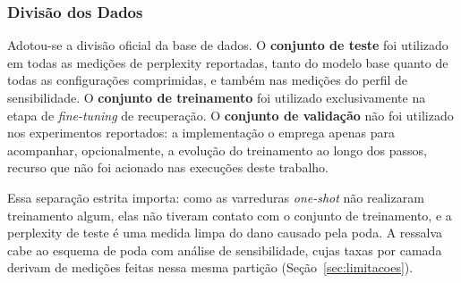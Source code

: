 \subsubsection{Divisão dos Dados}\label{subsec:divisao_dados}

Adotou-se a divisão oficial da base de dados. O \textbf{conjunto de teste} foi utilizado em todas as
medições de perplexity reportadas, tanto do modelo base quanto de todas as configurações
comprimidas, e também nas medições do perfil de sensibilidade. O
\textbf{conjunto de treinamento} foi utilizado exclusivamente na etapa de
\textit{fine-tuning} de recuperação. O \textbf{conjunto de
validação} não foi utilizado nos experimentos reportados: a implementação o emprega apenas
para acompanhar, opcionalmente, a evolução do treinamento ao longo dos passos, recurso que não
foi acionado nas execuções deste trabalho.

Essa separação estrita importa: como as varreduras \textit{one-shot} não realizaram
treinamento algum, elas não tiveram contato com o conjunto de treinamento, e a perplexity de
teste é uma medida limpa do dano causado pela poda. A ressalva cabe ao esquema de poda com
análise de sensibilidade, cujas taxas por camada derivam de medições feitas nessa mesma
partição (Seção~\ref{sec:limitacoes}).

